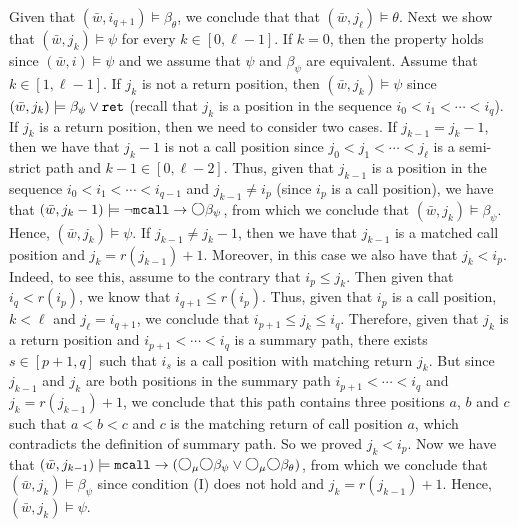 \documentclass{LMCS}
\newcommand{\M}{{\mu}}
\newcommand{\w}{{\bar{w}}}
\newcommand{\dm}{\Diamond}
\newcommand{\next}{\text{\raisebox{1pt}{$\bigcirc$}}}
\theoremstyle{plain}
\theoremstyle{definition}
\newcommand{\mcall}{{\tt{mcall}}}
\newcommand{\rett}{{\tt ret}}
\newcommand{\dmm}{\dm_{\M}}
\renewcommand{\dm}{\next}
\renewcommand{\dmm}{\dm_\M}
\begin{document}
\begin{enumerate}[(a)]
Given that $(\w, i_{q+1}) \models \beta_\theta$,
we conclude that that $(\w, j_\ell)
\models \theta$. Next we show that $(\w, j_k) \models \psi$ for every
$k \in [0,\ell-1]$. If $k = 0$, then the property holds since $(\w, i)
\models \psi$ and we assume that $\psi$ and $\beta_\psi$ are
equivalent.  Assume that $k \in [1,\ell-1]$. If $j_k$ is not a return
position, then $(\w, j_k) \models \psi$ since $(\w, j_k) \models
\beta_\psi \vee \rett$ (recall that $j_k$ is a position in the
sequence $i_0 < i_1 < \cdots < i_q$). If $j_k$ is a return position,
then we need 
to consider two cases. If $j_{k-1} = j_k-1$, then we have that $j_k-1$
is not a call position since $j_0 < j_1 < \cdots < j_\ell$ is a
semi-strict path and $k-1 \in [0,\ell-2]$. Thus, given that
$j_{k-1}$ is a position in the sequence $i_0 < i_1 < \cdots <
i_{q-1}$ and $j_{k-1} \neq i_p$ (since $i_p$ is a call position), we
have that $(\w, j_k-1) 
\models \neg \mcall \to \dm \beta_\psi$, from which we conclude that
$(\w, j_k) \models \beta_\psi$. Hence, $(\w, j_k) \models
\psi$. If $j_{k-1} \neq j_k-1$, then we have that $j_{k-1}$ is
a matched call position and $j_k = r(j_{k-1}) + 1$. Moreover, in this
case we also have that $j_k < i_p$. Indeed, to see this, assume to the
contrary that $i_p
\leq j_k$. Then given that $i_q < r(i_p)$, we know that $i_{q+1} \leq
r(i_p)$. Thus, given that $i_p$ is a call position, $k <
\ell$ and $j_\ell = i_{q+1}$, we conclude that $i_{p+1} \leq j_k \leq
i_q$. Therefore, given that $j_k$ is a return position and $i_{p+1} <
\cdots < i_q$ is a summary path, there exists
$s \in [p+1,q]$ such that $i_s$ is a call position with matching
return $j_k$. But since $j_{k-1}$ and $j_k$ are both positions in
the summary path $i_{p+1} < \cdots < i_q$ and $j_k = r(j_{k-1})+1$, we
conclude that this path 
contains three positions $a$, $b$ and $c$ such that $a < b < c$ and
$c$ is the matching return of call position $a$, which contradicts the
definition of summary path. So we proved  $j_k < i_p$. Now we have that $(\w,
j_{k-1}) \models \mcall \to
(\dmm \dm \beta_\psi \vee \dmm \dm \beta_\theta)$, from which we
conclude that $(\w, j_k) \models \beta_\psi$ since condition (I) does
not hold and $j_k = r(j_{k-1})+1$. Hence, $(\w, j_k) \models \psi$.
\end{enumerate}
\end{document}
